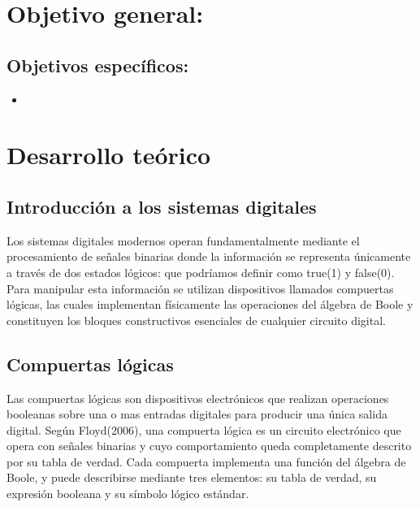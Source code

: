 \documentclass[12pt,letterpaper]{article}
\begin{document}
    \section{Objetivo general:}
    
    \subsection{Objetivos específicos:}
    \begin{itemize}
        \item 
    \end{itemize}

    \newpage
    \section{Desarrollo teórico}
    \subsection{Introducción a los sistemas digitales}
    Los sistemas digitales modernos operan fundamentalmente mediante el procesamiento de señales binarias donde la información se representa únicamente a través de dos estados lógicos: que podríamos definir como true(1) y false(0). Para manipular esta información se utilizan dispositivos llamados compuertas lógicas, las cuales implementan físicamente las  operaciones del álgebra de Boole y constituyen los bloques constructivos esenciales de cualquier circuito digital.
    
    \subsection{Compuertas lógicas}
    Las compuertas lógicas son dispositivos electrónicos que realizan operaciones booleanas sobre una o mas entradas digitales para producir una única salida digital. Según Floyd(2006), una compuerta lógica es un circuito electrónico que opera con señales binarias y cuyo comportamiento queda completamente descrito por su tabla de verdad.
    Cada compuerta implementa una función del álgebra de Boole, y puede describirse mediante tres elementos: su tabla de verdad, su expresión booleana y su símbolo lógico estándar.
\end{document}
